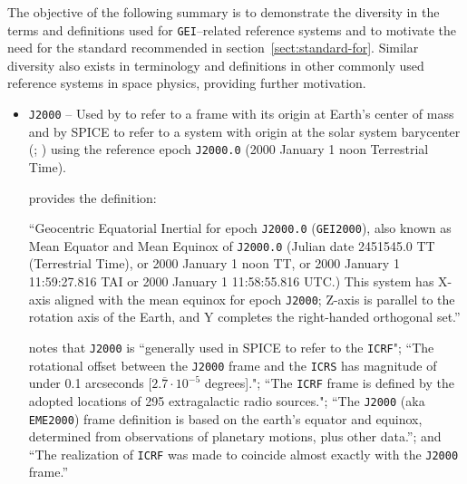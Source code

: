 \documentclass[draft]{agujournal2019}
\begin{document}
The objective of the following summary is to demonstrate the diversity in the terms and definitions used for \texttt{GEI}--related reference systems and to motivate the need for the standard recommended in section~\ref{sect:standard-for}. Similar diversity also exists in terminology and definitions in other commonly used reference systems in space physics, providing further motivation.


\begin{itemize}
    \parskip 0.1in 

    \item \texttt{J2000} -- Used by  to refer to a frame with its origin at Earth's center of mass and by SPICE to refer to a system with origin at the solar system barycenter (; ) using the reference epoch \texttt{J2000.0} (2000 January 1 noon Terrestrial Time).
    
      provides the definition:
     
     ``Geocentric Equatorial Inertial for epoch \texttt{J2000.0} (\texttt{GEI2000}), also known as Mean Equator and Mean Equinox of \texttt{J2000.0} (Julian date 2451545.0 TT (Terrestrial Time), or 2000 January 1 noon TT, or 2000 January 1 11:59:27.816 TAI or 2000 January 1 11:58:55.816 UTC.) This system has X-axis aligned with the mean equinox for epoch \texttt{J2000}; Z-axis is parallel to the rotation axis of the Earth, and Y completes the right-handed orthogonal set.''


     notes that \texttt{J2000} is ``generally used in SPICE to refer to the \texttt{ICRF}"; ``The rotational offset between the \texttt{J2000} frame and the \texttt{ICRS} has magnitude of under 0.1 arcseconds [$2.\overline{7}\cdot 10^{-5}$ degrees]."; ``The \texttt{ICRF} frame is defined by the adopted locations of 295 extragalactic radio sources."; ``The \texttt{J2000} (aka \texttt{EME2000}) frame definition is based on the earth’s equator and equinox, determined from observations of planetary motions, plus other data.''; and ``The realization of \texttt{ICRF} was made to coincide almost exactly with the \texttt{J2000} frame.'' 



\end{itemize}
\end{document}
